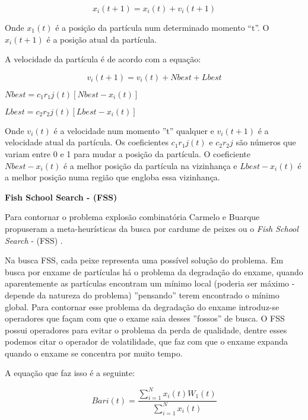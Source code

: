 \documentclass[conference,compsoc]{IEEEtran}
\begin{document}
\begin{equation}
x_i(t+1) = x_i(t) + v_i(t+1)
\end{equation}

Onde $x_1(t)$ é a posição da partícula num determinado momento ``t''. O $x_i(t+1) $ é a posição atual da partícula.

A velocidade da partícula é de acordo com a equação:

\begin{equation}
	v_i(t+1) = v_i(t) + Nbest + Lbest
\end{equation}

$Nbest = c_1r_1j(t)[Nbest - x_i(t)]$

$Lbest = c_2r_2j(t)[Lbest - x_i(t)]$
\vspace{0.2cm}

Onde $v_i(t)$ é a velocidade num momento ''t'' qualquer e $v_i(t+1)$ é a velocidade atual da partícula.
Os coeficientes $c_1r_1j(t)$ e $c_2r_2j$ são números que variam entre 0 e 1 para mudar a posição da partícula.
O coeficiente $Nbest - x_i(t)$ é a melhor posição da partícula na vizinhança e $Lbest - x_i(t)$ é a melhor posição
numa região que engloba essa vizinhança.


\vspace{0.3cm}
 \textbf{Fish School Search - (FSS)}
\vspace{0.1cm}


Para contornar o problema explosão combinatória Carmelo e Buarque propuseram a meta-heurísticas da busca por cardume de peixes
ou o \textit{Fish School Search} - (FSS) \cite{Filho2008}.

Na busca FSS, cada peixe representa uma possível solução do problema.
Em busca por enxame de partículas há o problema da degradação do enxame, quando aparentemente as partículas encontram
um mínimo local (poderia ser máximo - depende da natureza do problema) ''pensando'' terem encontrado o mínimo global.
Para contornar esse problema da degradação do enxame introduz-se operadores que façam com que o exame saia desses ''fossos''
de busca.
O FSS possui operadores para evitar o problema da perda de qualidade, dentre esses podemos citar o operador de volatilidade, 
que faz com que o enxame expanda quando o enxame se concentra por muito tempo.

A equação que faz isso é a seguinte:

\begin{equation}
Bari(t) = \frac{\sum_{i=1}^{N}x_i(t)W_1(t)}{\sum_{i=1}^{N}x_i(t)}
\end{equation}
\end{document}
